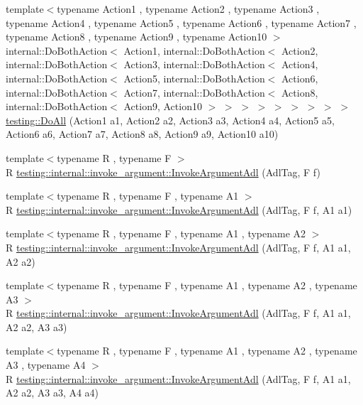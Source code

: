 \begin{DoxyCompactItemize}
\item 
{\footnotesize template$<$typename Action1 , typename Action2 , typename Action3 , typename Action4 , typename Action5 , typename Action6 , typename Action7 , typename Action8 , typename Action9 , typename Action10 $>$ }\\internal\+::\+Do\+Both\+Action$<$ Action1, internal\+::\+Do\+Both\+Action$<$ Action2, internal\+::\+Do\+Both\+Action$<$ Action3, internal\+::\+Do\+Both\+Action$<$ Action4, internal\+::\+Do\+Both\+Action$<$ Action5, internal\+::\+Do\+Both\+Action$<$ Action6, internal\+::\+Do\+Both\+Action$<$ Action7, internal\+::\+Do\+Both\+Action$<$ Action8, internal\+::\+Do\+Both\+Action$<$ Action9, Action10 $>$ $>$ $>$ $>$ $>$ $>$ $>$ $>$ $>$ \mbox{\hyperlink{namespacetesting_a79ac222c485c7aa0a1774bee17dadb10}{testing\+::\+Do\+All}} (Action1 a1, Action2 a2, Action3 a3, Action4 a4, Action5 a5, Action6 a6, Action7 a7, Action8 a8, Action9 a9, Action10 a10)
\item 
{\footnotesize template$<$typename R , typename F $>$ }\\R \mbox{\hyperlink{namespacetesting_1_1internal_1_1invoke__argument_a003f0228357c54422037bd3b448b355a}{testing\+::internal\+::invoke\+\_\+argument\+::\+Invoke\+Argument\+Adl}} (Adl\+Tag, F f)
\item 
{\footnotesize template$<$typename R , typename F , typename A1 $>$ }\\R \mbox{\hyperlink{namespacetesting_1_1internal_1_1invoke__argument_af07db25fc1b7486fb991495863bf1ab8}{testing\+::internal\+::invoke\+\_\+argument\+::\+Invoke\+Argument\+Adl}} (Adl\+Tag, F f, A1 a1)
\item 
{\footnotesize template$<$typename R , typename F , typename A1 , typename A2 $>$ }\\R \mbox{\hyperlink{namespacetesting_1_1internal_1_1invoke__argument_afe4a6811c2bcd0c6c51194b95e224f73}{testing\+::internal\+::invoke\+\_\+argument\+::\+Invoke\+Argument\+Adl}} (Adl\+Tag, F f, A1 a1, A2 a2)
\item 
{\footnotesize template$<$typename R , typename F , typename A1 , typename A2 , typename A3 $>$ }\\R \mbox{\hyperlink{namespacetesting_1_1internal_1_1invoke__argument_ae5e7bcffcae6a29e9c66298ead5ee91b}{testing\+::internal\+::invoke\+\_\+argument\+::\+Invoke\+Argument\+Adl}} (Adl\+Tag, F f, A1 a1, A2 a2, A3 a3)
\item 
{\footnotesize template$<$typename R , typename F , typename A1 , typename A2 , typename A3 , typename A4 $>$ }\\R \mbox{\hyperlink{namespacetesting_1_1internal_1_1invoke__argument_aace931066a0efe189d7a0c69f06b74ec}{testing\+::internal\+::invoke\+\_\+argument\+::\+Invoke\+Argument\+Adl}} (Adl\+Tag, F f, A1 a1, A2 a2, A3 a3, A4 a4)

\end{DoxyCompactItemize}
